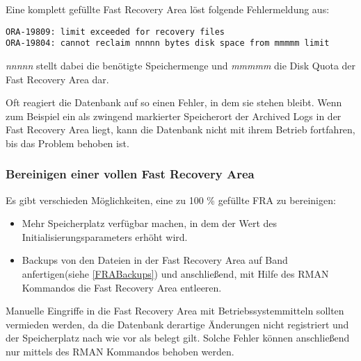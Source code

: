           Eine komplett gefüllte Fast Recovery Area löst folgende Fehlermeldung aus:
          \begin{lstlisting}[caption={100\% gefüllte Fast Recovery Area},label=admin1040,language=terminal]
ORA-19809: limit exceeded for recovery files
ORA-19804: cannot reclaim nnnnn bytes disk space from mmmmm limit
          \end{lstlisting}
          \textit{nnnnn} stellt dabei die benötigte Speichermenge und \textit{mmmmm} die Disk Quota der Fast Recovery Area dar.

          Oft reagiert die Datenbank auf so einen Fehler, in dem sie stehen bleibt. Wenn zum Beispiel ein als zwingend markierter Speicherort der Archived Logs in der Fast Recovery Area liegt, kann die Datenbank nicht mit ihrem Betrieb fortfahren, bis das Problem behoben ist.
        \subsubsection{Bereinigen einer vollen Fast Recovery Area}
          Es gibt verschieden Möglichkeiten, eine zu 100 \% gefüllte FRA zu bereinigen:
          \begin{itemize}
            \item Mehr Speicherplatz verfügbar machen, in dem der Wert des Initialisierungsparameters  erhöht wird.
            \item Backups von den Dateien in der Fast Recovery Area auf Band anfertigen(siehe \ref{FRABackups}) und anschließend, mit Hilfe des RMAN Kommandos  die Fast Recovery Area entleeren.
          \end{itemize}
          \begin{merke}
            Manuelle Eingriffe in die Fast Recovery Area mit Betriebssystemmitteln sollten vermieden werden, da die Datenbank derartige Änderungen nicht registriert und der Speicherplatz nach wie vor als belegt gilt. Solche Fehler können anschließend nur mittels des RMAN Kommandos  behoben werden.
          \end{merke}
